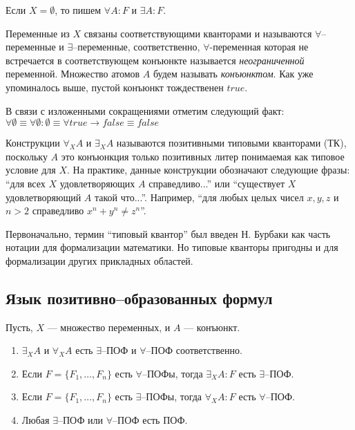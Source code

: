 Если $X = \emptyset$, то пишем $\forall A\colon F$ и $\exists A\colon F$. 


Переменные из $X$ связаны соответствующими кванторами и называются $\forall$--переменные и $\exists$--переменные, соответственно, $\forall$-переменная которая не встречается в соответствующем конъюнкте называется {\em неограниченной} переменной. Множество атомов $A$ будем называть {\em конъюнктом}. Как уже упоминалось выше, пустой конъюнкт тождественен $true$.

В связи с изложенными сокращениями отметим следующий факт: $\forall \emptyset \equiv \forall \emptyset:\emptyset \equiv \forall true \rightarrow false \equiv false$

Конструкции $\forall_XA$ и $\exists_XA$ называются позитивными типовыми кванторами (ТК), поскольку $A$ это конъюнкция только позитивных литер понимаемая как типовое условие для $X$. На практике, данные конструкции обозначают следующие фразы: ``для всех $X$ удовлетворяющих $A$ справедливо...'' или ``существует $X$ удовлетворяющий $A$ такой что...''. Например, ``для любых целых чисел $x,y,z$ и $n>2$ справедливо $x^n + y^n \ne z^n$''.

Первоначально, термин ``типовый квантор'' был введен Н. Бурбаки \cite{Bourbaki} как часть нотации для формализации математики. Но типовые кванторы пригодны и для формализации других прикладных областей.



\subsection{Язык позитивно--образованных формул}


\begin{definition}
\label{def:pcf}
Пусть, $X$ --- множество переменных, и $A$ --- конъюнкт.
\begin{enumerate}

\item $\exists_XA$ и $\forall_XA$ есть $\exists$--ПОФ и $\forall$--ПОФ соответственно. 

\item Если $F = \{F_1,\ldots,F_n\}$ есть $\forall$--ПОФы, тогда $\exists_XA\colon F$ есть $\exists$--ПОФ.

\item Если $F = \{F_1,\ldots,F_n\}$ есть $\exists$--ПОФы, тогда $\forall_XA\colon F$ есть $\forall$--ПОФ.

\item Любая $\exists$--ПОФ или $\forall$--ПОФ есть ПОФ.  
\end{enumerate}
\end{definition}

